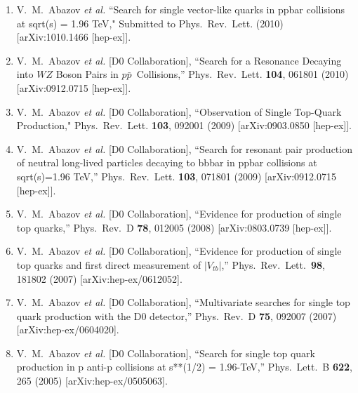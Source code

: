 \documentclass[12pt]{article}
\begin{document}
\vspace{-2mm}
\begin{enumerate}

\item{ V.~M.~Abazov {\it et al.} ``Search for single vector-like quarks in ppbar collisions at sqrt(s) = 1.96 TeV," Submitted to Phys.\ Rev.\  Lett. (2010) [arXiv:1010.1466 [hep-ex]].
}

\item{  V.~M.~Abazov {\it et al.}  [D0 Collaboration],
  ``Search for a Resonance Decaying into $WZ$ Boson Pairs in $p\bar{p}$~Collisions,''
  Phys.\ Rev.\  Lett. {\bf 104}, 061801 (2010)
  [arXiv:0912.0715 [hep-ex]].
}

\item{  V.~M.~Abazov {\it et al.}  [D0 Collaboration], ``Observation of Single Top-Quark Production,"
  Phys.\ Rev.\ Lett. {\bf 103}, 092001 (2009)
  [arXiv:0903.0850 [hep-ex]].
}

\item{  V.~M.~Abazov {\it et al.}  [D0 Collaboration],
  ``Search for resonant pair production of neutral long-lived particles decaying to bbbar in ppbar collisions at sqrt(s)=1.96 TeV,''
  Phys.\ Rev.\ Lett. {\bf 103}, 071801 (2009)
  [arXiv:0912.0715 [hep-ex]].
}

\item{  V.~M.~Abazov {\it et al.}  [D0 Collaboration],
  ``Evidence for production of single top quarks,''
  Phys.\ Rev.\  D {\bf 78}, 012005 (2008)
  [arXiv:0803.0739 [hep-ex]].
}

\item{  V.~M.~Abazov {\it et al.}  [D0 Collaboration],
  ``Evidence for production of single top quarks and first direct measurement of $|V_{tb}|$,''
  Phys.\ Rev.\ Lett.\  {\bf 98}, 181802 (2007)
  [arXiv:hep-ex/0612052].
}

\item{  V.~M.~Abazov {\it et al.}  [D0 Collaboration],
  ``Multivariate searches for single top quark production with the D0
  detector,''
  Phys.\ Rev.\  D {\bf 75}, 092007 (2007)
  [arXiv:hep-ex/0604020].
}
  
\item{  V.~M.~Abazov {\it et al.}  [D0 Collaboration],
  ``Search for single top quark production in p anti-p collisions at  s**(1/2)
  = 1.96-TeV,''
  Phys.\ Lett.\  B {\bf 622}, 265 (2005)
  [arXiv:hep-ex/0505063].
}

\end{enumerate}
\end{document}
